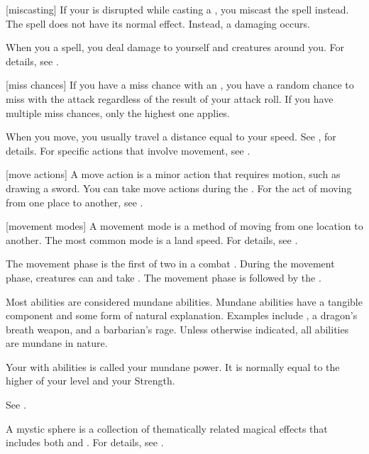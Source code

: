 [miscasting] If your  is disrupted while casting a , you miscast the spell instead.
The spell does not have its normal effect.
Instead, a damaging  occurs.

 When you  a spell, you deal damage to yourself and creatures around you.
For details, see .

[miss chances] If you have a miss chance with an , you have a random chance to miss with the attack regardless of the result of your attack roll.
If you have multiple miss chances, only the highest one applies.

 When you move, you usually travel a distance equal to your speed.
See , for details.
For specific actions that involve movement, see .

[move actions] A move action is a minor action that requires motion, such as drawing a sword.
You can take move actions during the .
For the act of moving from one place to another, see .

[movement modes] A movement mode is a method of moving from one location to another.
The most common mode is a land speed.
For details, see .

 The movement phase is the first of two  in a combat .
During the movement phase, creatures can  and take .
The movement phase is followed by the .

 Most abilities are considered mundane abilities.
Mundane abilities have a tangible component and some form of natural explanation.
Examples include , a dragon's breath weapon, and a barbarian's rage.
Unless otherwise indicated, all abilities are mundane in nature.

 Your  with  abilities is called your mundane power.
It is normally equal to the higher of your level and your Strength.

 See .

 A mystic sphere is a collection of thematically related magical effects that includes both  and .
For details, see .

